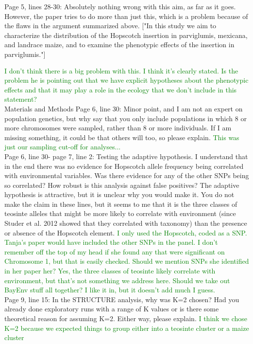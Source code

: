 \documentclass[11pt]{article}
\newcommand{\lev}[1]{\noindent \textcolor{green}{{#1}} \\}
\begin{document}
Page 5, lines 28-30:  Absolutely nothing wrong with this aim, as far as it goes.  However, the paper tries to do more than just this, which is a problem because of the flaws in the argument summarized above.
["In this study we aim to characterize the distribution of the Hopscotch insertion in parviglumis, mexicana, and landrace maize, and to examine the phenotypic effects of the insertion in parviglumis."]

\lev{I don't think there is a big problem with this. I think it's clearly stated. Is the problem he is pointing out that we have explicit hypotheses about the phenotypic effects and that it may play a role in the ecology that we don't include in this statement?}
Materials and Methods
Page 6, line 30: Minor point, and I am not an expert on population genetics, but why say that you only include populations in which 8 or more chromosomes were sampled, rather than 8 or more individuals.  If I am missing something, it could be that others will too, so please explain.
\lev{This was just our sampling cut-off for analyses...}

Page 6, line 30- page 7, line 2: Testing the adaptive hypothesis.  I understand that in the end there was no evidence for Hopscotch allele frequency being correlated with environmental variables.  Was there evidence for any of the other SNPs being so correlated?  How robust is this analysis against false positives?  The adaptive hypothesis is attractive, but it is unclear why you would make it.  You do not make the claim in these lines, but it seems to me that it is the three classes of teosinte alleles that might be more likely to correlate with environment (since Studer et al. 2012 showed that they correlated with taxonomy) than the presence or absence of the Hopscotch element.  
\lev{I only used the Hopscotch, coded as a SNP. Tanja's paper would have included the other SNPs in the panel. I don't remember off the top of my head if she found any that were significant on Chromosome 1, but that is easily checked. Should we mention SNPs she identified in her paper her? Yes, the three classes of teosinte likely correlate with environment, but that's not something we address here. Should we take out BayEnv stuff all together? I like it in, but it doesn't add much I guess.}

Page 9, line 15: In the STRUCTURE analysis, why was K=2 chosen?  Had you already done exploratory runs with a range of K values or is there some theoretical reason for assuming K=2.  Either way, please explain.
\lev{I think we chose K=2 because we expected things to group either into a teosinte cluster or a maize cluster}
\end{document}
